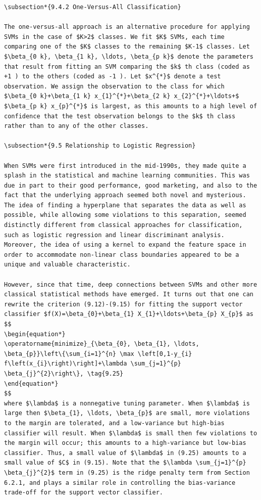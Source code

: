 \documentclass[10pt]{article}
\begin{document}
\begin{verbatim}
\subsection*{9.4.2 One-Versus-All Classification}

The one-versus-all approach is an alternative procedure for applying SVMs in the case of $K>2$ classes. We fit $K$ SVMs, each time comparing one of the $K$ classes to the remaining $K-1$ classes. Let $\beta_{0 k}, \beta_{1 k}, \ldots, \beta_{p k}$ denote the parameters that result from fitting an SVM comparing the $k$ th class (coded as +1 ) to the others (coded as -1 ). Let $x^{*}$ denote a test observation. We assign the observation to the class for which $\beta_{0 k}+\beta_{1 k} x_{1}^{*}+\beta_{2 k} x_{2}^{*}+\ldots+$ $\beta_{p k} x_{p}^{*}$ is largest, as this amounts to a high level of confidence that the test observation belongs to the $k$ th class rather than to any of the other classes.

\subsection*{9.5 Relationship to Logistic Regression}

When SVMs were first introduced in the mid-1990s, they made quite a splash in the statistical and machine learning communities. This was due in part to their good performance, good marketing, and also to the fact that the underlying approach seemed both novel and mysterious. The idea of finding a hyperplane that separates the data as well as possible, while allowing some violations to this separation, seemed distinctly different from classical approaches for classification, such as logistic regression and linear discriminant analysis. Moreover, the idea of using a kernel to expand the feature space in order to accommodate non-linear class boundaries appeared to be a unique and valuable characteristic.

However, since that time, deep connections between SVMs and other more classical statistical methods have emerged. It turns out that one can rewrite the criterion (9.12)-(9.15) for fitting the support vector classifier $f(X)=\beta_{0}+\beta_{1} X_{1}+\ldots+\beta_{p} X_{p}$ as
$$
\begin{equation*}
\operatorname{minimize}_{\beta_{0}, \beta_{1}, \ldots, \beta_{p}}\left\{\sum_{i=1}^{n} \max \left[0,1-y_{i} f\left(x_{i}\right)\right]+\lambda \sum_{j=1}^{p} \beta_{j}^{2}\right\}, \tag{9.25}
\end{equation*}
$$
where $\lambda$ is a nonnegative tuning parameter. When $\lambda$ is large then $\beta_{1}, \ldots, \beta_{p}$ are small, more violations to the margin are tolerated, and a low-variance but high-bias classifier will result. When $\lambda$ is small then few violations to the margin will occur; this amounts to a high-variance but low-bias classifier. Thus, a small value of $\lambda$ in (9.25) amounts to a small value of $C$ in (9.15). Note that the $\lambda \sum_{j=1}^{p} \beta_{j}^{2}$ term in (9.25) is the ridge penalty term from Section 6.2.1, and plays a similar role in controlling the bias-variance trade-off for the support vector classifier.


\end{verbatim}
\end{document}
